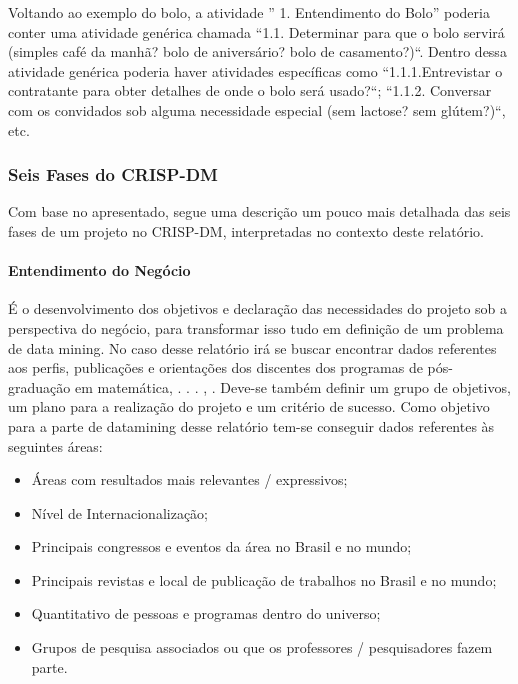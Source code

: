 \documentclass[]{article}
\providecommand{\tightlist}{%
  \setlength{\itemsep}{0pt}\setlength{\parskip}{0pt}}
\let\oldparagraph\paragraph
\renewcommand{\paragraph}[1]{\oldparagraph{#1}\mbox{}}
\begin{document}
Voltando ao exemplo do bolo, a atividade '' 1. Entendimento do Bolo''
poderia conter uma atividade genérica chamada ``1.1. Determinar para que
o bolo servirá (simples café da manhã? bolo de aniversário? bolo de
casamento?)``. Dentro dessa atividade genérica poderia haver atividades
específicas como ``1.1.1.Entrevistar o contratante para obter detalhes
de onde o bolo será usado?``; ``1.1.2. Conversar com os convidados sob
alguma necessidade especial (sem lactose? sem glútem?)``, etc.

\subsubsection{Seis Fases do CRISP-DM}\label{seis-fases-do-crisp-dm}

Com base no apresentado, segue uma descrição um pouco mais detalhada das
seis fases de um projeto no CRISP-DM, interpretadas no contexto deste
relatório.

\paragraph{Entendimento do Negócio}\label{entendimento-do-negocio}

É o desenvolvimento dos objetivos e declaração das necessidades do
projeto sob a perspectiva do negócio, para transformar isso tudo em
definição de um problema de data mining. No caso desse relatório irá se
buscar encontrar dados referentes aos perfis, publicações e orientações
dos discentes dos programas de pós-graduação em matemática, . . . , .
Deve-se também definir um grupo de objetivos, um plano para a realização
do projeto e um critério de sucesso. Como objetivo para a parte de
datamining desse relatório tem-se conseguir dados referentes às
seguintes áreas:

\begin{itemize}
\tightlist
\item
  Áreas com resultados mais relevantes / expressivos;
\item
  Nível de Internacionalização;
\item
  Principais congressos e eventos da área no Brasil e no mundo;
\item
  Principais revistas e local de publicação de trabalhos no Brasil e no
  mundo;
\item
  Quantitativo de pessoas e programas dentro do universo;
\item
  Grupos de pesquisa associados ou que os professores / pesquisadores
  fazem parte.
\end{itemize}
\end{document}
